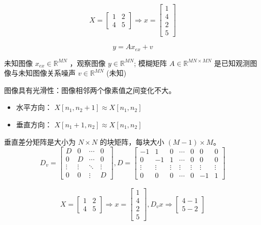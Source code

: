 \begin{example}
    $$ 
X=\left[\begin{array}{ll}
1 & 2 \\
4 & 5
\end{array}\right] \Rightarrow x=\left[\begin{array}{l}
1 \\
4 \\
2 \\
5
\end{array}\right]
$$
\end{example}

$$
y=A x_{e x}+v
$$

未知图像 $ x_{e x} \in \mathbb{R}^{M N} $ ，观察图像 $ y \in \mathbb{R}^{M N} $;
模糊矩阵 $ A \in \mathbb{R}^{M N \times M N} $ 是已知观测图像与未知图像关系噪声 $ v \in \mathbb{R}^{M N} $ (未知)

图像具有光滑性：图像相邻两个像素值之间变化不大。

\begin{itemize}
    \item 水平方向： $ X\left[n_{1}, n_{2}+1\right] \approx X\left[n_{1}, n_{2}\right] $
    \item 垂直方向： $ X\left[n_{1}+1, n_{2}\right] \approx X\left[n_{1}, n_{2}\right] $
\end{itemize}

\begin{definition}[垂直差分矩阵]
    
    垂直差分矩阵是大小为 $ N \times N $ 的块矩阵，每块大小 $ (M-1)   \times M $。
    $$D_{v}=\left[\begin{array}{cccc}
        D & 0 & \cdots & 0 \\
        0 & D & \cdots & 0 \\
        \vdots & \vdots & \ddots & \vdots \\
        0 & 0 & \vdots & D
        \end{array}\right], D=\left[\begin{array}{ccccccc}
        -1 & 1 & 0 & \cdots & 0 & 0 & 0 \\
        0 & -1 & 1 & \cdots & 0 & 0 & 0 \\
        \vdots & \vdots & \vdots & \vdots & \vdots & \vdots & \vdots \\
        0 & 0 & 0 & \cdots & 0 & -1 & 1
        \end{array}\right] $$
\end{definition}

$$
\begin{array}{c}
X=\left[\begin{array}{ll}
1 & 2 \\
4 & 5
\end{array}\right] \Rightarrow x=\left[\begin{array}{l}
1 \\
4 \\
2 \\
5
\end{array}\right], D_{v} x \Rightarrow\left[\begin{array}{l}
4-1 \\
5-2
\end{array}\right]
\end{array}
$$

